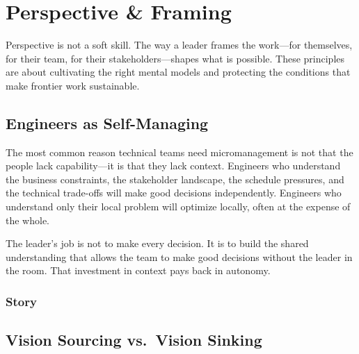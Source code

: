 
\chapter{Perspective \& Framing}


Perspective is not a soft skill. The way a leader frames the work---for themselves,
for their team, for their stakeholders---shapes what is possible. These principles
are about cultivating the right mental models and protecting the conditions that
make frontier work sustainable.

\section{Engineers as Self-Managing}


The most common reason technical teams need micromanagement is not that the people
lack capability---it is that they lack context. Engineers who understand the business
constraints, the stakeholder landscape, the schedule pressures, and the technical
trade-offs will make good decisions independently. Engineers who understand only their
local problem will optimize locally, often at the expense of the whole.

The leader's job is not to make every decision. It is to build the shared
understanding that allows the team to make good decisions without the leader
in the room. That investment in context pays back in autonomy.

\subsection{Story}

\section{Vision Sourcing vs.\ Vision Sinking}

